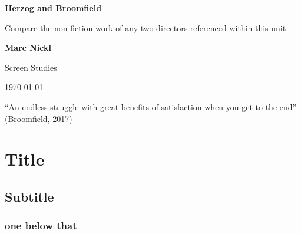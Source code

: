 \documentclass[
  12pt,
]{book}
\author{}
\date{}
\begin{document}
\frontmatter

\mainmatter
{}

\begin{titlepage}
    \begin{center}
        \vspace*{4cm}
            
  \LARGE
        \textbf{Herzog and Broomfield}
            
 \vspace{0.5cm}
        \Large
        Compare the non-fiction work of any two directors referenced within this unit
            
   \vspace{10cm}
            
\textbf{Marc Nickl}
            
\vfill
            
            
 \vspace{0.8cm}
                        
   \large
        Screen Studies 
        
\today
            
 \end{center}
\end{titlepage}

\setcounter{tocdepth}{3}
\tableofcontents
\pagebreak

\vspace{20pt}

\begin{center}
“An endless struggle with great benefits of satisfaction when you get to the end” (Broomfield, 2017)

\end{center}

\vspace{20pt}

\hypertarget{title}{%
\section{Title}\label{title}}

\hypertarget{subtitle}{%
\subsection{Subtitle}\label{subtitle}}

\hypertarget{one-below-that}{%
\subsubsection{one below that}\label{one-below-that}}
\end{document}
